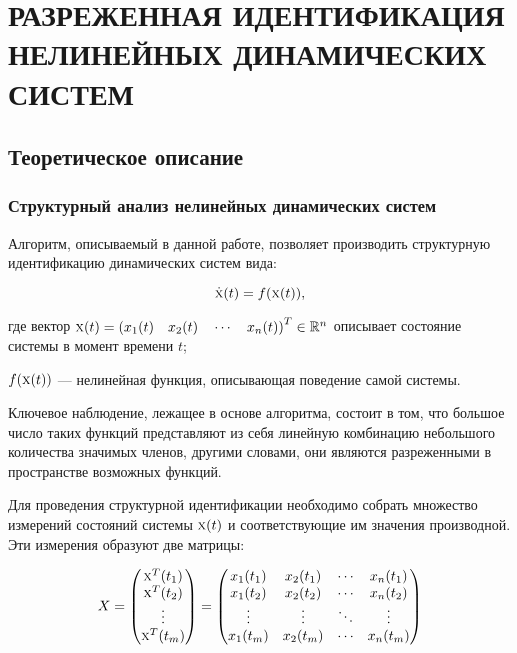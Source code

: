 \section{РАЗРЕЖЕННАЯ ИДЕНТИФИКАЦИЯ НЕЛИНЕЙНЫХ ДИНАМИЧЕСКИХ СИСТЕМ}

\subsection{Теоретическое описание}

\subsubsection{Структурный анализ нелинейных динамических систем}

Алгоритм, описываемый в данной работе, позволяет производить структурную идентификацию динамических систем \cite{sindy} вида:

\begin{equation}
\dot{\textsc{x}}(t) = f(\textsc{x}(t)),
\end{equation}

где вектор $\textsc{x}(t) = \left(x_1(t) \quad x_2(t) \quad \cdots \quad x_n(t)\right)^T \in \mathbb{R}^n$ описывает состояние системы в момент времени $t$;\par 
$f(\textsc{x}(t))$ --- нелинейная функция, описывающая поведение самой системы.

Ключевое наблюдение, лежащее в основе алгоритма, состоит в том, что большое число таких функций представляют из себя линейную комбинацию небольшого количества значимых членов, другими словами, они являются разреженными в пространстве возможных функций.

Для проведения структурной идентификации необходимо собрать множество измерений состояний системы $\textsc{x}(t)$ и соответствующие им значения производной. Эти измерения образуют две матрицы:

\begin{equation}
X =
\begin{pmatrix}
\textsc{x}^T(t_1) \\	
\textsc{x}^T(t_2) \\
\vdots \\	
\textsc{x}^T(t_m)	
\end{pmatrix}
=
\begin{pmatrix}
x_1(t_1) & x_2(t_1) & \cdots & x_n(t_1) \\
x_1(t_2) & x_2(t_2) & \cdots & x_n(t_2) \\
\vdots & \vdots & \ddots & \vdots \\
x_1(t_m) & x_2(t_m) & \cdots & x_n(t_m)
\end{pmatrix}
\end{equation}

